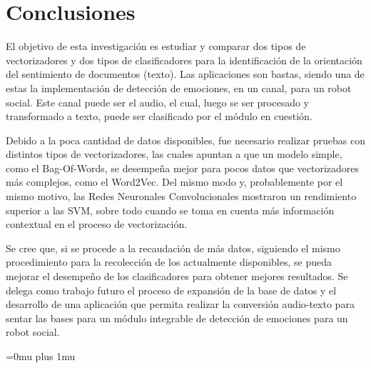 \documentclass[conference]{IEEEtran}
\begin{document}




\section{Conclusiones} \label{sec:conclusiones}
    
	El objetivo de esta investigación es estudiar y comparar dos tipos de vectorizadores y dos tipos de clasificadores para la identificación de la orientación del sentimiento de documentos (texto). Las aplicaciones son bastas, siendo una de estas la implementación de detección de emociones, en un canal, para un robot social. Este canal puede ser el audio, el cual, luego se ser procesado y transformado a texto, puede ser clasificado por el módulo en cuestión.
    
    Debido a la poca cantidad de datos disponibles, fue necesario realizar pruebas con distintos tipos de vectorizadores, las cuales apuntan a que un modelo simple, como el Bag-Of-Words, se desempeña mejor para pocos datos que vectorizadores más complejos, como el Word2Vec. Del mismo modo y, probablemente por el mismo motivo, las Redes Neuronales Convolucionales mostraron un rendimiento superior a las SVM, sobre todo cuando se toma en cuenta más información contextual en el proceso de vectorización.
    
    Se cree que, si se procede a la recaudación de más datos, siguiendo el mismo procedimiento para la recolección de los actualmente disponibles, se pueda mejorar el desempeño de los clasificadores para obtener mejores resultados. Se delega como trabajo futuro el proceso de expansión de la base de datos y el desarrollo de una aplicación que permita realizar la conversión audio-texto para sentar las bases para un módulo integrable de detección de emociones para un robot social.




\Urlmuskip=0mu plus 1mu\relax

\nocite{*}


\end{document}

